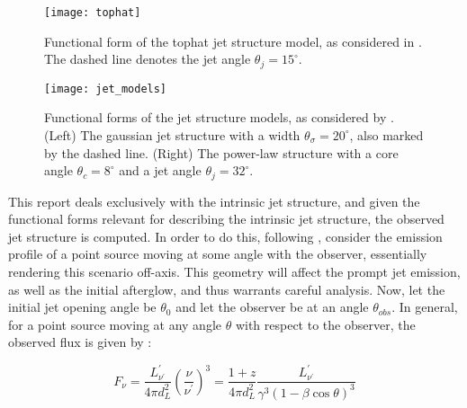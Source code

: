 \begin{itemize}
    \end{itemize}

    \begin{figure}[H]
        \centering
        \texttt{[image: tophat]}
        \caption[Tophat jet structure model]{
                    Functional form of the tophat jet structure model, as considered in
                    \cite{saleem_2020B}. The dashed line denotes the jet angle
                    $\theta_j = 15^{\circ}$.
             }
        \label{fig:tophat}
    \end{figure}

    \begin{figure}[H]
        \centering
        \texttt{[image: jet\_models]}
        \caption[Jet structures as in \cite{hayes_2020}]{
                    Functional forms of the jet structure models, as considered by
                    \cite{hayes_2020}. (Left) The gaussian jet structure with
                    a width $\theta_{\sigma} = 20^{\circ}$, also marked by the dashed
                    line. (Right) The power-law structure with a core angle $\theta_c =
                    8^\circ$ and a jet angle $\theta_j = 32^\circ$.
             }
        \label{fig:jet_models}
    \end{figure}

    This report deals exclusively with the intrinsic jet structure, and given the
    functional forms relevant for describing the intrinsic jet structure, the observed
    jet structure is computed. In order to do this, following \cite{granot_2002},
    consider the emission profile of a point source moving at some angle with the
    observer, essentially rendering this scenario off-axis. This geometry will affect
    the prompt jet emission, as well as the initial afterglow, and thus warrants careful
    analysis.  Now, let the initial jet opening angle be $\theta_0$ and let the observer
    be at an angle $\theta_{obs}$.  In general, for a point source moving at any angle
    $\theta$ with respect to the observer, the observed flux is given by :

    \begin{equation}
        \label{eq:1}
        F_{\nu} =
           \dfrac{L^{\prime}_{\nu^{\prime}}}{4 \pi d_L^2}
           \left( \dfrac{\nu}{\nu^\prime}\right)^3
                =
            \dfrac{1 + z}{4 \pi d_L^2}
            \dfrac{L^{\prime}_{\nu^{\prime}}}{\gamma^3 (1 - \beta \cos \theta)^3}
    \end{equation}

